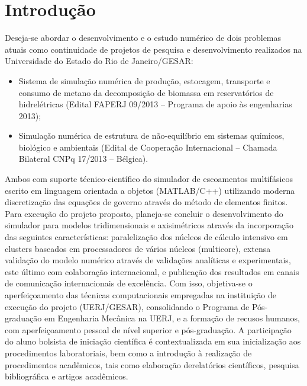 \documentclass[a4paper,portuges,12pt]{article}
\begin{document}
\section{Introdução}
Deseja-se abordar o desenvolvimento e o estudo numérico de dois
problemas atuais como continuidade de projetos de pesquisa e
desenvolvimento realizados na Universidade do Estado do Rio de
Janeiro/GESAR: 

\begin{itemize}
\item Sistema de simulação numérica de produção, estocagem,
transporte e consumo de metano da decomposição de biomassa em
reservatórios de hidrelétricas (Edital FAPERJ 09/2013 – Programa de
apoio às engenharias 2013); 
\item Simulação numérica de estrutura de
não-equilíbrio em sistemas químicos, biológico e ambientais (Edital de
Cooperação Internacional – Chamada Bilateral CNPq 17/2013 – Bélgica).
\end{itemize}

Ambos com suporte técnico-científico do simulador de escoamentos
multifásicos escrito em linguagem orientada a objetos (MATLAB/C++)
utilizando moderna discretização das equações de governo através do
método de elementos finitos. Para execução do projeto proposto,
planeja-se concluir o desenvolvimento do simulador para modelos
tridimensionais e axisimétricos através da incorporação das seguintes
características: paralelização dos núcleos de cálculo intensivo em
clusters baseados em processadores de vários núcleos (multicore),
extensa validação do modelo numérico através de validações analíticas e
experimentais, este último com colaboração internacional, e publicação
dos resultados em canais de comunicação internacionais de excelência.
Com isso, objetiva-se o aperfeiçoamento das técnicas computacionais
empregadas na instituição de execução do projeto (UERJ/GESAR),
consolidando o Programa de Pós-graduação em Engenharia Mecânica na UERJ,
e a formação de recusos humanos, com aperfeiçoamento pessoal de nível
superior e pós-graduação. A participação do aluno bolsista de iniciação
científica é contextualizada em sua inicialização aos procedimentos
laboratoriais, bem como a introdução à realização de procedimentos
acadêmicos, tais como elaboração derelatórios científicos, pesquisa
bibliográfica e artigos acadêmicos.
\end{document}
